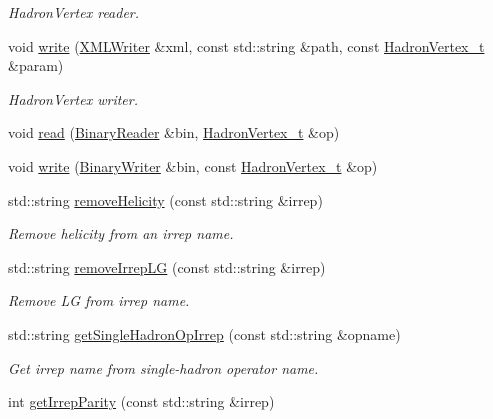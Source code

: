 \begin{DoxyCompactItemize}
\begin{DoxyCompactList}\small\item\em Hadron\+Vertex reader. \end{DoxyCompactList}\item 
void \mbox{\hyperlink{namespaceHadron_a9309edc67ae704a831f01ae854c5bf12}{write}} (\mbox{\hyperlink{classADATXML_1_1XMLWriter}{X\+M\+L\+Writer}} \&xml, const std\+::string \&path, const \mbox{\hyperlink{structHadron_1_1HadronVertex__t}{Hadron\+Vertex\+\_\+t}} \&param)
\begin{DoxyCompactList}\small\item\em Hadron\+Vertex writer. \end{DoxyCompactList}\item 
void \mbox{\hyperlink{namespaceHadron_a2aedc52f1b4f522f0fc13bbf7426e727}{read}} (\mbox{\hyperlink{classADATIO_1_1BinaryReader}{Binary\+Reader}} \&bin, \mbox{\hyperlink{structHadron_1_1HadronVertex__t}{Hadron\+Vertex\+\_\+t}} \&op)
\item 
void \mbox{\hyperlink{namespaceHadron_a6d8b26c4e0e11ca4b20e046f2595326e}{write}} (\mbox{\hyperlink{classADATIO_1_1BinaryWriter}{Binary\+Writer}} \&bin, const \mbox{\hyperlink{structHadron_1_1HadronVertex__t}{Hadron\+Vertex\+\_\+t}} \&op)
\item 
std\+::string \mbox{\hyperlink{namespaceHadron_a877ae1e797f5cf4d4ebb7e22d5bbe69b}{remove\+Helicity}} (const std\+::string \&irrep)
\begin{DoxyCompactList}\small\item\em Remove helicity from an irrep name. \end{DoxyCompactList}\item 
std\+::string \mbox{\hyperlink{namespaceHadron_aff55b5fd81ffee95432b7d4e1c8d01e6}{remove\+Irrep\+LG}} (const std\+::string \&irrep)
\begin{DoxyCompactList}\small\item\em Remove LG from irrep name. \end{DoxyCompactList}\item 
std\+::string \mbox{\hyperlink{namespaceHadron_a9b05418ba46746a99fb402de358096d3}{get\+Single\+Hadron\+Op\+Irrep}} (const std\+::string \&opname)
\begin{DoxyCompactList}\small\item\em Get irrep name from single-\/hadron operator name. \end{DoxyCompactList}\item 
int \mbox{\hyperlink{namespaceHadron_af182dccf3462f82247a3d86df38c2da0}{get\+Irrep\+Parity}} (const std\+::string \&irrep)

\end{DoxyCompactItemize}
